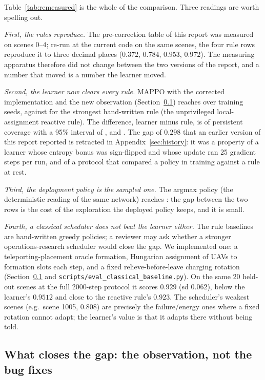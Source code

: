 \documentclass[conference]{IEEEtran}
\begin{document}
Table~\ref{tab:remeasured} is the whole of the comparison.  Three readings are
worth spelling out.

\emph{First, the rules reproduce.}  The pre-correction table of this report
was measured on scenes $0$--$4$; re-run at the current code on the same
scenes, the four rule rows reproduce it to three decimal places ($0.372$,
$0.784$, $0.953$, $0.972$).  The measuring apparatus therefore did not change
between the two versions of the report, and a number that moved is a number
the learner moved.

\emph{Second, the learner now clears every rule.}  MAPPO with the corrected
implementation and the new observation (Section~\ref{sec:results_abl}) reaches
\tokEgoShapeCK{} over \tokEgoShapeN{} training seeds, against
\tokRuleReactiveLocalCK{} for the strongest hand-written rule (the
unprivileged local-assignment reactive rule).  The difference, learner minus
rule, is \tokLearnerMinusRule{} of persistent coverage with a 95\% interval
of \tokLearnerMinusRuleCi, and \tokGapVerdict.  The gap of $0.298$ that an
earlier version of this report reported is retracted in
Appendix~\ref{sec:history}: it was a property of a learner whose entropy bonus
was sign-flipped and whose update ran 25 gradient steps per run, and of a
protocol that compared a policy in training against a rule at rest.

\emph{Third, the deployment policy is the sampled one.}  The argmax policy
(the deterministic reading of the same network) reaches \tokEgoShapeDetCK{}:
the gap between the two rows is the cost of the exploration the deployed
policy keeps, and it is small.

\emph{Fourth, a classical scheduler does not beat the learner either.}  The
rule baselines are hand-written greedy policies; a reviewer may ask whether a
stronger operations-research scheduler would close the gap.  We implemented
one: a teleporting-placement oracle formation, Hungarian assignment of UAVs
to formation slots each step, and a fixed relieve-before-leave charging
rotation (Section~\ref{sec:results_abl} and
\texttt{scripts/eval\_classical\_baseline.py}).  On the same 20 held-out
scenes at the full 2000-step protocol it scores $0.929$ (sd $0.062$),
below the learner's $0.9512$ and close to the reactive rule's $0.923$.  The
scheduler's weakest scenes (e.g.\ scene 1005, $0.808$) are precisely the
failure/energy ones where a fixed rotation cannot adapt; the learner's value
is that it adapts there without being told.

\subsection{What closes the gap: the observation, not the bug fixes}
\label{sec:results_abl}
\end{document}
